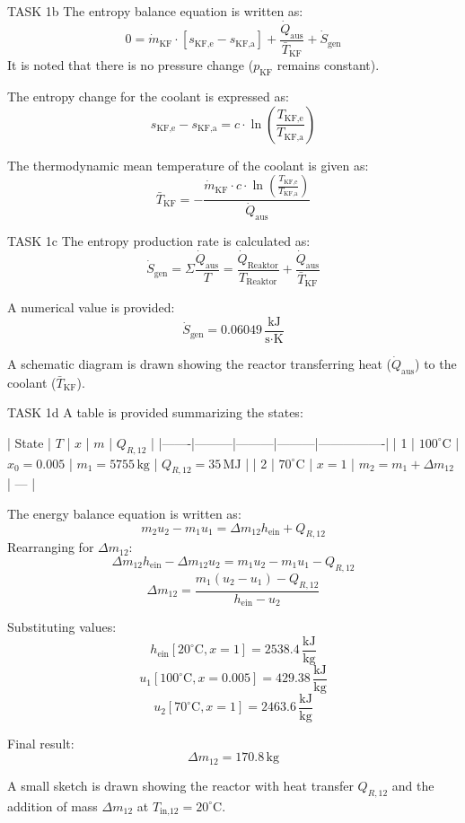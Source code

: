 TASK 1b  
The entropy balance equation is written as:  
\[
0 = \dot{m}_{\text{KF}} \cdot \left[ s_{\text{KF,e}} - s_{\text{KF,a}} \right] + \frac{\dot{Q}_{\text{aus}}}{\bar{T}_{\text{KF}}} + \dot{S}_{\text{gen}}
\]  
It is noted that there is no pressure change (\( p_{\text{KF}} \) remains constant).  

The entropy change for the coolant is expressed as:  
\[
s_{\text{KF,e}} - s_{\text{KF,a}} = c \cdot \ln\left(\frac{T_{\text{KF,e}}}{T_{\text{KF,a}}}\right)
\]  

The thermodynamic mean temperature of the coolant is given as:  
\[
\bar{T}_{\text{KF}} = -\frac{\dot{m}_{\text{KF}} \cdot c \cdot \ln\left(\frac{T_{\text{KF,e}}}{T_{\text{KF,a}}}\right)}{\dot{Q}_{\text{aus}}}
\]  

TASK 1c  
The entropy production rate is calculated as:  
\[
\dot{S}_{\text{gen}} = \Sigma \frac{\dot{Q}_{\text{aus}}}{T} = \frac{\dot{Q}_{\text{Reaktor}}}{T_{\text{Reaktor}}} + \frac{\dot{Q}_{\text{aus}}}{\bar{T}_{\text{KF}}}
\]  

A numerical value is provided:  
\[
\dot{S}_{\text{gen}} = 0.06049 \, \frac{\text{kJ}}{\text{s·K}}
\]  

A schematic diagram is drawn showing the reactor transferring heat (\( \dot{Q}_{\text{aus}} \)) to the coolant (\( \bar{T}_{\text{KF}} \)).  

TASK 1d  
A table is provided summarizing the states:  

| State | \( T \) | \( x \) | \( m \) | \( Q_{R,12} \) |  
|-------|---------|---------|---------|----------------|  
| 1     | \( 100^\circ\text{C} \) | \( x_0 = 0.005 \) | \( m_1 = 5755 \, \text{kg} \) | \( Q_{R,12} = 35 \, \text{MJ} \) |  
| 2     | \( 70^\circ\text{C} \) | \( x = 1 \) | \( m_2 = m_1 + \Delta m_{12} \) | — |  

The energy balance equation is written as:  
\[
m_2 u_2 - m_1 u_1 = \Delta m_{12} h_{\text{ein}} + Q_{R,12}
\]  
Rearranging for \( \Delta m_{12} \):  
\[
\Delta m_{12} h_{\text{ein}} - \Delta m_{12} u_2 = m_1 u_2 - m_1 u_1 - Q_{R,12}
\]  
\[
\Delta m_{12} = \frac{m_1 (u_2 - u_1) - Q_{R,12}}{h_{\text{ein}} - u_2}
\]  

Substituting values:  
\[
h_{\text{ein}}[20^\circ\text{C}, x=1] = 2538.4 \, \frac{\text{kJ}}{\text{kg}}
\]  
\[
u_1[100^\circ\text{C}, x=0.005] = 429.38 \, \frac{\text{kJ}}{\text{kg}}
\]  
\[
u_2[70^\circ\text{C}, x=1] = 2463.6 \, \frac{\text{kJ}}{\text{kg}}
\]  

Final result:  
\[
\Delta m_{12} = 170.8 \, \text{kg}
\]  

A small sketch is drawn showing the reactor with heat transfer \( Q_{R,12} \) and the addition of mass \( \Delta m_{12} \) at \( T_{\text{in,12}} = 20^\circ\text{C} \).